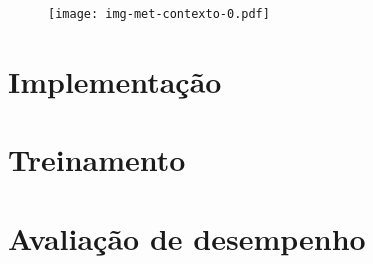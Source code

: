 \begin{figure}
\centering
\texttt{[image: img-met-contexto-0.pdf]}
\label{fig:contexto0}
\end{figure}


\section{Implementação}


\section{Treinamento}

\section{Avaliação de desempenho}\label{sec:desemp}

